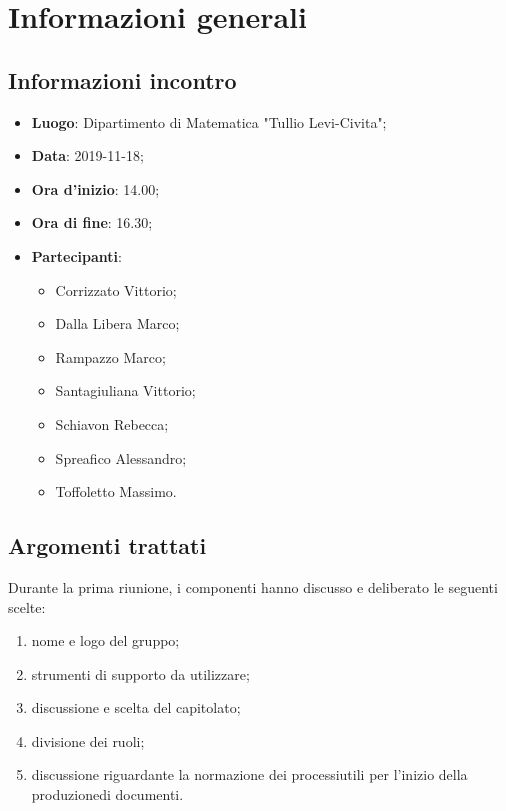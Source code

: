 \section{Informazioni generali}
    \subsection{Informazioni incontro}
        \begin{itemize}
            \item \textbf{Luogo}: Dipartimento di Matematica "Tullio Levi-Civita";
            \item \textbf{Data}: 2019-11-18;
            \item \textbf{Ora d'inizio}: 14.00;
            \item \textbf{Ora di fine}: 16.30;
            \item \textbf{Partecipanti}: \begin{itemize}
                \item Corrizzato Vittorio;
                \item Dalla Libera Marco;
                \item Rampazzo Marco;
                \item Santagiuliana Vittorio;
                \item Schiavon Rebecca;
                \item Spreafico Alessandro;
                \item Toffoletto Massimo.
            \end{itemize}
        \end{itemize}
    \subsection{Argomenti trattati}
        Durante la prima riunione, i componenti hanno discusso e deliberato le seguenti scelte:
        \begin{enumerate}
            \item nome e logo del gruppo;
            \item strumenti di supporto da utilizzare;
            \item discussione e scelta del capitolato\glo;
            \item divisione dei ruoli;
            \item discussione riguardante la normazione dei processi\glosp utili per l'inizio della produzione\glosp di documenti.
        \end{enumerate}

